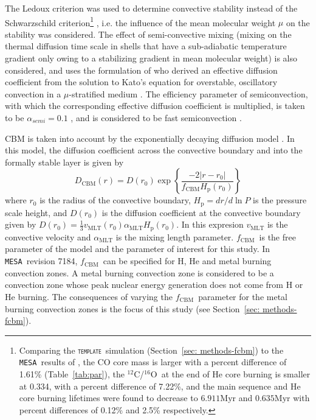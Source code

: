 \documentclass[useAMS,usenatbib]{mn2e}
\newcommand{\Hp}{\ensuremath{H_{\mathrm{p}}}}
\newcommand{\fcbm}{\ensuremath{f_\mathrm{CBM}}}
\newcommand{\mesa}{\texttt{MESA}}
\newcommand{\template}{\textsc{\texttt{template}}}
\newcommand{\nuclei}[2]{\ensuremath{\mathrm{^{#1}#2}}}
\newcommand{\carbon}[1][12]{\nuclei{#1}{C}}
\newcommand{\oxygen}[1][16]{\nuclei{#1}{O}}
\begin{document}
The Ledoux criterion \citep{Ledoux1947,Sakashita1959}
was used to determine convective stability instead of the Schwarzschild criterion\footnote{Comparing the \template\ simulation (Section~\ref{sec: methods-fcbm}) to the \mesa~results of \citet{Jones2015}, the CO core mass is larger with a percent difference of 1.61\% (Table~\ref{tab:par}), the \carbon/\oxygen\ at the end of He core burning is smaller at 0.334, with a percent difference of 7.22\%, and the main sequence and He core burning lifetimes were found to decrease to $6.911\mathrm{Myr}$ and $0.635\mathrm{Myr}$ with percent differences of 0.12\% and 2.5\% respectively.}
 \citep{Schwarzschild1958}, i.e. the influence of the mean molecular
weight $\mu$ on the stability was considered.  The effect of semi-convective
mixing (mixing on the thermal diffusion time scale in shells that have a
sub-adiabatic temperature gradient only owing to a stabilizing gradient in mean
molecular weight) is also considered, and uses the formulation of
\citet{Langer1983} who derived an effective diffusion coefficient from the
solution to Kato's equation for overstable, oscillatory convection in a
$\mu$-stratified medium \citep{Kato1966}. The efficiency parameter of
semiconvection, with which the corresponding effective diffusion coefficient is
multiplied, is taken to be $\alpha_{semi}=0.1$ \citep{Langer1983}, and is
considered to be fast semiconvection \citep[][see also Section 6.2 of \citealp{Maeder2009} for a discussion about the fidelity of this
approximation]{Woosley2007}. 

CBM is taken into account by the exponentially decaying diffusion model 
\citep{Freytag1996,Herwig1997}. In this model, the diffusion coefficient across
the convective boundary and into the formally stable layer is given by
\begin{equation}
\label{eq: DCBM}
D_{\mathrm{CBM}}(r)=D(r_0)
\exp\left\{{\dfrac{-2|r-r_0|}{f_{\mathrm{CBM}}\Hp(r_0)}}\right\}
\end{equation}
where $r_0$ is the radius of the convective boundary, $\Hp = dr/d\ln P$ is the
pressure scale height, and $D(r_0)$ is the diffusion
coefficient at the convective boundary given by $D(r_0)=\frac{1}{3}v_\mathrm{MLT}(r_0) \alpha_{\mathrm{MLT}} \Hp(r_0)$.
In this expresion $v_\mathrm{MLT}$ is the convective velocity and $\alpha_{\mathrm{MLT}}$ is the mixing length parameter. \fcbm~is the free parameter of
the model and the parameter of interest for this study. In \mesa~revision 7184, \fcbm\ can be specified for H, He and metal burning convection zones. A metal burning convection zone is
considered to be a convection zone whose peak nuclear energy generation
does not come from H or He burning. The consequences of varying the \fcbm\ parameter for the metal burning convection zones is the focus of this study (see Section~\ref{sec: methods-fcbm}).
\end{document}
